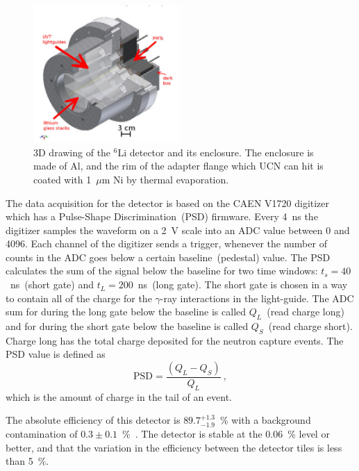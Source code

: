 \begin{figure}[h!]
  \centering
  \includegraphics[width=0.5\textwidth]{Li6detector.png}
  \caption[3D drawing of the $^6$Li detector and its enclosure]{3D
    drawing of the $^6$Li detector and its enclosure. The enclosure is
    made of Al, and the rim of the adapter flange which UCN can hit is
    coated with 1~$\mu$m Ni by thermal evaporation. }
  \label{fig:Li6detector}
\end{figure}

The data acquisition for the detector is based on the CAEN V1720
digitizer which has a Pulse-Shape Discrimination~(PSD) firmware. Every
4~ns the digitizer samples the waveform on a 2~V scale into an ADC
value between 0 and 4096. Each channel of the digitizer sends a
trigger, whenever the number of counts in the ADC goes below a certain
baseline~(pedestal) value. The PSD calculates the sum of the signal
below the baseline for two time windows: $t_s = 40$~ns~(short gate)
and $t_L = 200$~ns~(long gate). The short gate is chosen in a way to
contain all of the charge for the $\gamma$-ray interactions in the
light-guide. The ADC sum for during the long gate below the baseline
is called $Q_L$~(read charge long) and for during the short gate below
the baseline is called $Q_S$~(read charge short). Charge long has the
total charge deposited for the neutron capture events. The PSD value is
defined as
\begin{equation}
  \label{eq:psd}
  \mathrm{PSD} = \frac{\left( Q_L - Q_S\right)}{Q_L}~,
\end{equation}  
which is the amount of charge in the tail of an event.

The absolute efficiency of this detector is $89.7^{+1.3}_{-1.9}$~\%
with a background contamination of
$0.3 \pm 0.1$~\%~\cite{jamieson2017characterization}. The detector is
stable at the 0.06~\% level or better, and that the variation in the
efficiency between the detector tiles is less than 5~\%.
